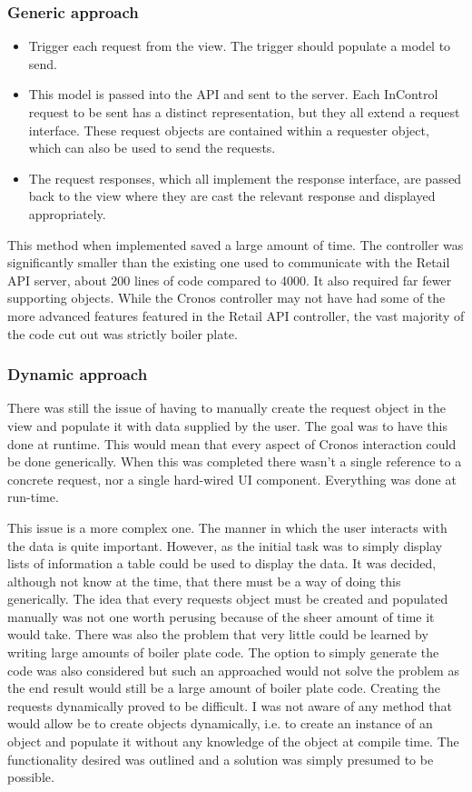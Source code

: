 \documentclass[a4paper, 11pt, titlepage]{article}
\begin{document}
\subsubsection{Generic approach} 
\begin{itemize} 
\item Trigger each request from the view. The trigger should populate a model to send. \label{cronos_generic_api} 
\item This model is passed into the API and sent to the server. Each InControl request to be sent has a distinct representation, but they all extend a request interface. These request objects are contained within a requester object, which can also be used to send the requests. 
\item The request responses, which all implement the response interface, are passed back to the view where they are cast the relevant response and displayed appropriately. 
\end{itemize} 
This method when implemented saved a large amount of time. The controller was significantly smaller than the existing one used to communicate with the Retail API server, about 200 lines of code compared to 4000. It also required far fewer supporting objects. While the Cronos controller may not have had some of the more advanced features featured in the Retail API controller, the vast majority of the code cut out was strictly boiler plate. 
\subsubsection{Dynamic approach} \label{dynamic_smart}
There was still the issue of having to manually create the request object in the view and populate it with data supplied by the user. The goal was to have this done at runtime. This would mean that every aspect of Cronos interaction could be done generically. When this was completed there wasn't a single reference to a concrete request, nor a single hard-wired UI component. Everything was done at run-time.

This issue is a more complex one. The manner in which the user interacts with the data is quite important. However, as the initial task was to simply display lists of information a table could be used to display the data. It was decided, although not know at the time, that there must be a way of doing this generically. The idea that every requests object must be created and populated manually was not one worth perusing because of the sheer amount of time it would take. There was also the problem that very little could be learned by writing large amounts of boiler plate code. The option to simply generate the code was also considered but such an approached would not solve the problem as the end result would still be a large amount of boiler plate code. Creating the requests dynamically proved to be difficult. I was not aware of any method that would allow be to create objects dynamically, i.e. to create an instance of an object and populate it without any knowledge of the object at compile time. The functionality desired was outlined and a solution was simply presumed to be possible.  
\end{document}

